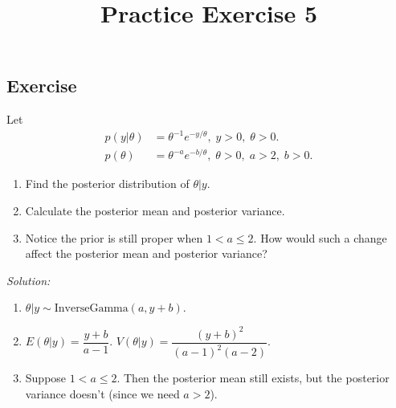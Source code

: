 \documentclass[12pt]{article}
\title{Practice Exercise 5}
\author{}
\date{}
\newcommand{\tht}{\theta}
\begin{document}
\maketitle



\subsection*{Exercise}



Let 
\begin{align*}
p(y|\theta) &= \tht^{-1}e^{-y/\tht},\; y>0,\; \tht>0.\\
p(\tht) &= \tht^{-a}e^{-b/\tht},\; \tht>0,\;a>2,\;b>0.
\end{align*}

\begin{enumerate}
\item Find the posterior distribution of $\tht|y.$ 
\item Calculate the posterior mean and posterior variance. 
\item Notice the prior is still proper when $1<a\leq2.$ How would such a change affect the posterior mean and posterior variance?\\
\end{enumerate}

\newpage

\emph{Solution:}
\begin{enumerate}
\item $\theta|y \sim \text{InverseGamma}(a,y+b).$
\item $E(\theta|y) = \dfrac{y+b}{a-1}.$
$V(\theta|y) = \dfrac{(y+b)^2}{(a-1)^2(a-2)}.$
\item Suppose $1<a\leq2.$ Then the posterior mean still exists, but the posterior variance doesn't (since we need $a>2$).


\end{enumerate}
\end{document}
